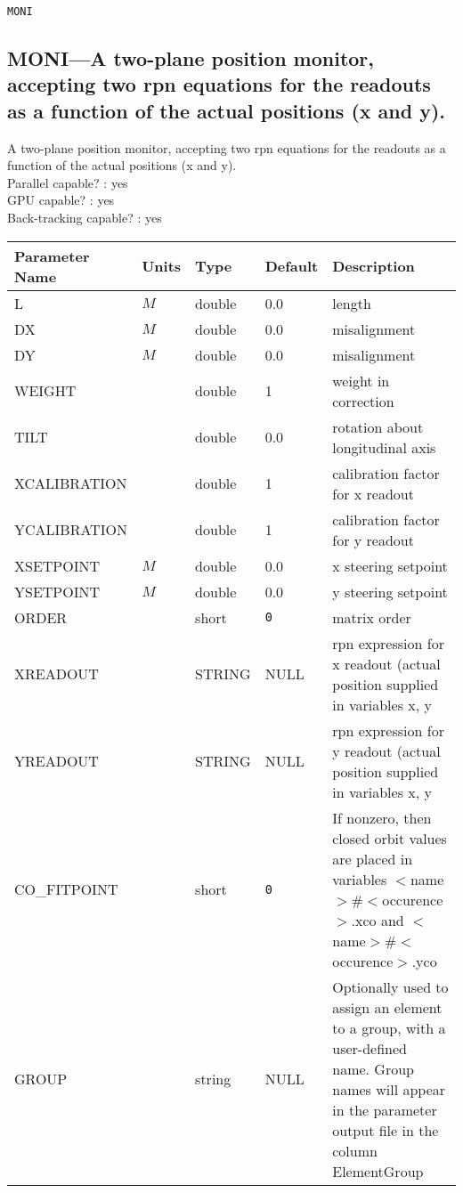 \vspace*{0.5in}

\newpage
\begin{center}{\Large\verb|MONI|}\end{center}
\subsection{MONI---A two-plane position monitor, accepting two rpn equations for the readouts as a function of the actual positions (x and y).}
A two-plane position monitor, accepting two rpn equations for the readouts as a function of the actual positions (x and y).
\\
Parallel capable? : yes\\
GPU capable? : yes\\
Back-tracking capable? : yes\\
\begin{tabular}{|l|l|l|l|p{\descwidth}|} \hline
Parameter Name & Units & Type & Default & Description \\ \hline 
L & $M$ & double &  0.0 & length  \\ \hline 
DX & $M$ & double &  0.0 & misalignment  \\ \hline 
DY & $M$ & double &  0.0 & misalignment  \\ \hline 
WEIGHT &  & double &   1 & weight in correction  \\ \hline 
TILT &  & double &  0.0 & rotation about longitudinal axis  \\ \hline 
XCALIBRATION &  & double &   1 & calibration factor for x readout  \\ \hline 
YCALIBRATION &  & double &   1 & calibration factor for y readout  \\ \hline 
XSETPOINT & $M$ & double &  0.0 & x steering setpoint  \\ \hline 
YSETPOINT & $M$ & double &  0.0 & y steering setpoint  \\ \hline 
ORDER &  & short &  \verb|0| & matrix order  \\ \hline 
XREADOUT &  & STRING &   NULL            & rpn expression for x readout (actual position supplied in variables x, y  \\ \hline 
YREADOUT &  & STRING &   NULL            & rpn expression for y readout (actual position supplied in variables x, y  \\ \hline 
CO\_FITPOINT &  & short &  \verb|0| & If nonzero, then closed orbit values are placed in variables $<$name$>$\#$<$occurence$>$.xco and $<$name$>$\#$<$occurence$>$.yco  \\ \hline 
GROUP &  & string & NULL & Optionally used to assign an element to a group, with a user-defined name.  Group names will appear in the parameter output file in the column ElementGroup  \\ \hline 
\end{tabular}

